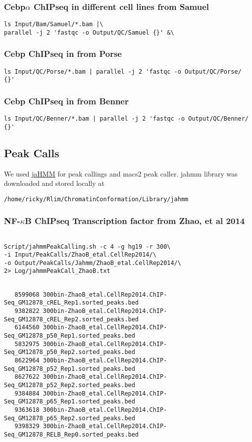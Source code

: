 \documentclass{article}\usepackage[]{graphicx}\usepackage[]{color}
\begin{document}
\subsubsection{Cebp$\alpha$ ChIPseq in different cell lines from Samuel}
\begin{verbatim}
ls Input/Bam/Samuel/*.bam |\ 
parallel -j 2 'fastqc -o Output/QC/Samuel {}' &\
\end{verbatim}

\subsubsection{Cebp ChIPseq in from Porse}
\begin{verbatim}
ls Input/QC/Porse/*.bam | parallel -j 2 'fastqc -o Output/QC/Porse/ {}'
\end{verbatim}

\subsubsection{Cebp ChIPseq in from Benner}
\begin{verbatim}
ls Input/QC/Benner/*.bam | parallel -j 2 'fastqc -o Output/QC/Benner/ {}'
\end{verbatim}

\subsection{Peak Calls}
We used \href{https://github.com/gui11aume/zerone/tree/master/doc}{jaHMM} for peak callings and macs2 peak caller.
jahmm library was downloaded and stored locally at 

\verb|/home/ricky/Rlim/ChromatinConformation/Library/jahmm|

\subsubsection{NF-$\kappa$B ChIPseq Transcription factor from Zhao, et al 2014}
\begin{verbatim}

Script/jahmmPeakCalling.sh -c 4 -g hg19 -r 300\ 
-i Input/PeakCalls/ZhaoB_etal.CellRep2014/\ 
-o Output/PeakCalls/Jahmm/ZhaoB_etal.CellRep2014/\ 
2> Log/jahmmPeakCall_ZhaoB.txt 


\end{verbatim}

\begin{verbatim}
   8599068 300bin-ZhaoB_etal.CellRep2014.ChIP-Seq_GM12878_cREL_Rep1.sorted_peaks.bed
   9382822 300bin-ZhaoB_etal.CellRep2014.ChIP-Seq_GM12878_cREL_Rep2.sorted_peaks.bed
   6144560 300bin-ZhaoB_etal.CellRep2014.ChIP-Seq_GM12878_p50_Rep1.sorted_peaks.bed
   5832975 300bin-ZhaoB_etal.CellRep2014.ChIP-Seq_GM12878_p50_Rep2.sorted_peaks.bed
   8622964 300bin-ZhaoB_etal.CellRep2014.ChIP-Seq_GM12878_p52_Rep1.sorted_peaks.bed
   8627622 300bin-ZhaoB_etal.CellRep2014.ChIP-Seq_GM12878_p52_Rep2.sorted_peaks.bed
   9384884 300bin-ZhaoB_etal.CellRep2014.ChIP-Seq_GM12878_p65_Rep1.sorted_peaks.bed
   9363618 300bin-ZhaoB_etal.CellRep2014.ChIP-Seq_GM12878_p65_Rep2.sorted_peaks.bed
   9398329 300bin-ZhaoB_etal.CellRep2014.ChIP-Seq_GM12878_RELB_Rep0.sorted_peaks.bed
\end{verbatim}
\end{document}
